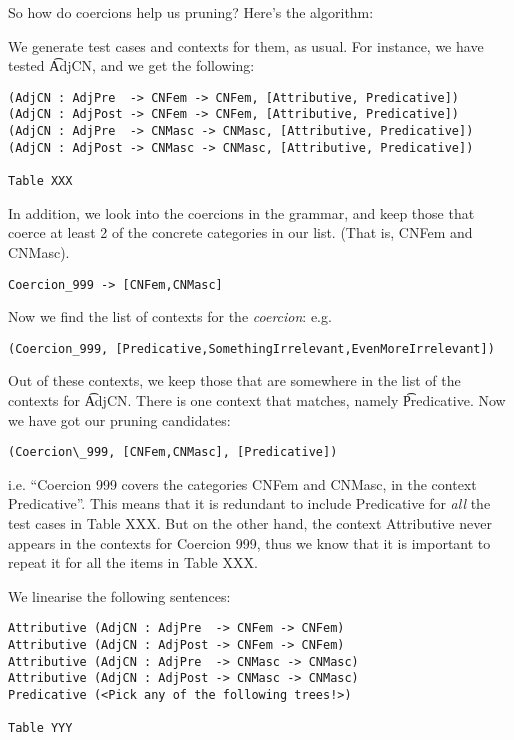 So how do coercions help us pruning? Here's the algorithm:

We generate test cases and contexts for them, as usual.
For instance, we have tested \t{AdjCN}, and we get the following:

\begin{verbatim}
(AdjCN : AdjPre  -> CNFem -> CNFem, [Attributive, Predicative])
(AdjCN : AdjPost -> CNFem -> CNFem, [Attributive, Predicative])
(AdjCN : AdjPre  -> CNMasc -> CNMasc, [Attributive, Predicative])
(AdjCN : AdjPost -> CNMasc -> CNMasc, [Attributive, Predicative])

Table XXX
\end{verbatim}

In addition, we look into the coercions in the grammar, and keep those
that coerce at least 2 of the concrete categories in our list. (That
is, CNFem and CNMasc).

\begin{verbatim}
Coercion_999 -> [CNFem,CNMasc]
\end{verbatim}

Now we find the list of contexts for the \emph{coercion}: e.g.

\begin{verbatim}
(Coercion_999, [Predicative,SomethingIrrelevant,EvenMoreIrrelevant])
\end{verbatim}

Out of these contexts, we keep those that are somewhere in the list of
the contexts for \t{AdjCN}. There is one context that matches, namely
\t{Predicative}. Now we have got our pruning candidates:

\begin{verbatim}
(Coercion\_999, [CNFem,CNMasc], [Predicative])
\end{verbatim}

i.e. ``Coercion 999 covers the categories CNFem and CNMasc, in the
context Predicative''. This means that it is redundant to include
Predicative for \emph{all} the test cases in Table XXX. But on the
other hand, the context Attributive never appears in the contexts for
Coercion 999, thus we know that it is important to repeat it for all
the items in Table XXX.

We linearise the following sentences:

\begin{verbatim}
Attributive (AdjCN : AdjPre  -> CNFem -> CNFem)
Attributive (AdjCN : AdjPost -> CNFem -> CNFem)
Attributive (AdjCN : AdjPre  -> CNMasc -> CNMasc)
Attributive (AdjCN : AdjPost -> CNMasc -> CNMasc)
Predicative (<Pick any of the following trees!>)

Table YYY
\end{verbatim}

